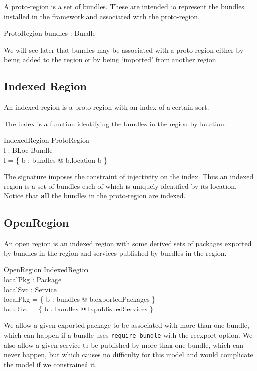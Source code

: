 \documentclass[a4paper,9pt]{article}
\begin{document}
A proto-region is a set of bundles.
These are intended to represent the bundles installed in the framework and associated with the proto-region.
\begin{schema}{ProtoRegion}
  bundles : \power Bundle \\
\end{schema}
We will see later that bundles may be associated with a proto-region either by being added to the region or by
being `imported' from another region.

\subsection{Indexed Region}

An indexed region is a proto-region with an index of a certain sort.

The index is a function identifying the bundles in the region by location.
\begin{schema}{IndexedRegion}
  ProtoRegion \\
  l : BLoc \pinj Bundle \\
\where
  l = \{ b : bundles @ b.location \mapsto b \} \\
\end{schema}
The signature imposes the constraint of injectivity on the index.
Thus an indexed region is a set of bundles each of which is uniquely identified
by its location.
Notice that \textbf{all} the bundles in the proto-region are indexed.

\subsection{OpenRegion}

An open region is an indexed region with some derived sets of packages exported by bundles in the region
and services published by bundles in the region.

\begin{schema}{OpenRegion}
  IndexedRegion \\
  localPkg : \power Package \\
  localSvc : \power Service \\
\where
  localPkg = \bigcup \{ b : bundles @ b.exportedPackages \} \\
  localSvc = \bigcup \{ b : bundles @ b.publishedServices \} \\
\end{schema}
We allow a given exported package to be associated with more than one bundle, which can happen if a bundle uses
\texttt{require-bundle} with the reexport option.
We also allow a given service to be published by more than one bundle, which can never happen, but which causes
no difficulty for this model and would complicate the model if we constrained it.
\end{document}
